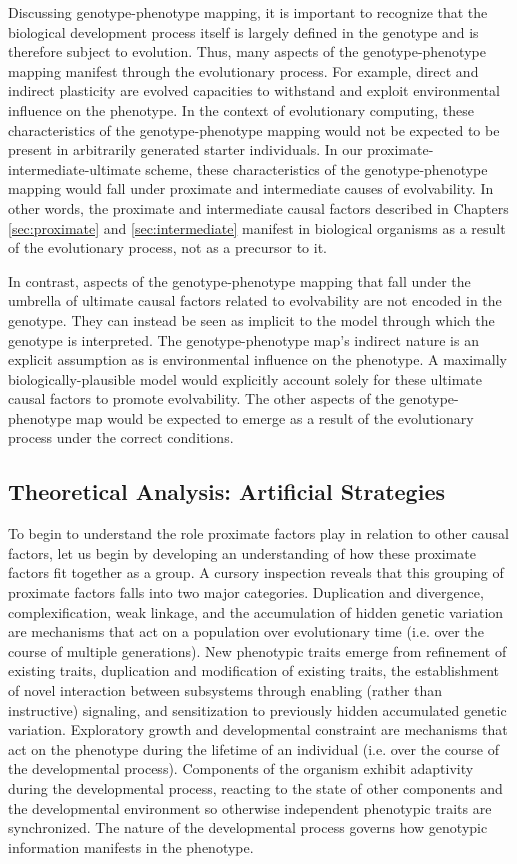 Discussing genotype-phenotype mapping, it is important to recognize that the biological development process itself is largely defined in the genotype and is therefore subject to evolution.
Thus, many aspects of the genotype-phenotype mapping manifest through the evolutionary process.
For example, direct and indirect plasticity are evolved capacities to withstand and exploit environmental influence on the phenotype.
In the context of evolutionary computing, these characteristics of the genotype-phenotype mapping would not be expected to be present in arbitrarily generated starter individuals.
In our proximate-intermediate-ultimate scheme, these characteristics of the genotype-phenotype mapping would fall under proximate and intermediate causes of evolvability.
In other words, the proximate and intermediate causal factors described in Chapters \ref{sec:proximate} and \ref{sec:intermediate} manifest in biological organisms as a result of the evolutionary process, not as a precursor to it.

In contrast, aspects of the genotype-phenotype mapping that fall under the umbrella of ultimate causal factors related to evolvability are not encoded in the genotype.
They can instead be seen as implicit to the model through which the genotype is interpreted.
The genotype-phenotype map's indirect nature is an explicit assumption as is environmental influence on the phenotype.
A maximally biologically-plausible model would explicitly account solely for these ultimate causal factors to promote evolvability.
The other aspects of the genotype-phenotype map would be expected to emerge as a result of the evolutionary process under the correct conditions.

\subsection{Theoretical Analysis: Artificial Strategies}
To begin to understand the role proximate factors play in relation to other causal factors, let us begin by developing an understanding of how these proximate factors fit together as a group.
A cursory inspection reveals that this grouping of proximate factors falls into two major categories.
Duplication and divergence, complexification, weak linkage, and the accumulation of hidden genetic variation are mechanisms that act on a population over evolutionary time (i.e. over the course of multiple generations).
New phenotypic traits emerge from refinement of existing traits, duplication and modification of existing traits, the establishment of novel interaction between subsystems through enabling (rather than instructive) signaling, and sensitization to previously hidden accumulated genetic variation.
Exploratory growth and developmental constraint are mechanisms that act on the phenotype during the lifetime of an individual (i.e. over the course of the developmental process).
Components of the organism exhibit adaptivity during the developmental process, reacting to the state of other components and the developmental environment so otherwise independent phenotypic traits are synchronized.
The nature of the developmental process governs how genotypic information manifests in the phenotype.

